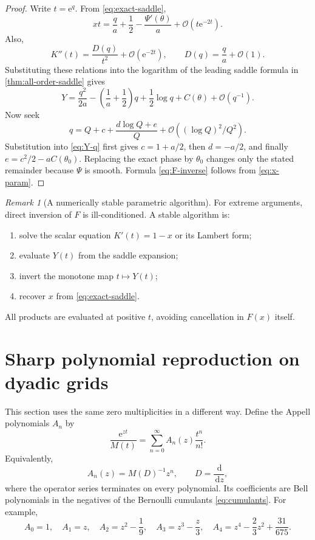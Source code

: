 \documentclass[11pt,oneside]{article}
\theoremstyle{definition}
\theoremstyle{remark}
\newtheorem{remark}[theorem]{Remark}
\newcommand{\e}{\mathrm e}
\newcommand{\dd}{\,\mathrm d}
\newcommand{\bigO}{\mathcal O}
\begin{document}
\begin{proof}
Write \(t=\e^q\).  From \eqref{eq:exact-saddle},
\[
 xt=\frac q a+\frac12-\frac{\Psi'(\theta)}a+\bigO(t\e^{-2t}).
 \label{eq:x-param}
\]
Also,
\[
 K''(t)
 =\frac{D(q)}{t^2}+\bigO(\e^{-2t}),
 \qquad
 D(q)=\frac q a+\bigO(1).
\]
Substituting these relations into the logarithm of the leading saddle formula
in \cref{thm:all-order-saddle} gives
\begin{equation}
 Y
 =\frac{q^2}{2a}
  -\left(\frac1a+\frac12\right)q
  +\frac12\log q
  +C(\theta)
  +\bigO(q^{-1}).
 \label{eq:Y-q}
\end{equation}
Now seek
\[
 q=Q+c+\frac{d\log Q+e}{Q}
   +\bigO((\log Q)^2/Q^2).
\]
Substitution into \eqref{eq:Y-q} first gives
\(c=1+a/2\), then \(d=-a/2\), and finally
\(e=c^2/2-aC(\theta_0)\).  Replacing the exact phase by \(\theta_0\)
changes only the stated remainder because \(\Psi\) is smooth.  Formula
\eqref{eq:F-inverse} follows from \eqref{eq:x-param}.
\end{proof}

\begin{remark}[A numerically stable parametric algorithm]
For extreme arguments, direct inversion of \(F\) is ill-conditioned.
A stable algorithm is:
\begin{enumerate}[label=\arabic*.,leftmargin=2em]
\item solve the scalar equation \(K'(t)=1-x\) or its Lambert form;
\item evaluate \(Y(t)\) from the saddle expansion;
\item invert the monotone map \(t\mapsto Y(t)\);
\item recover \(x\) from \eqref{eq:exact-saddle}.
\end{enumerate}
All products are evaluated at positive \(t\), avoiding cancellation in
\(F(x)\) itself.
\end{remark}

\section{Sharp polynomial reproduction on dyadic grids}

This section uses the same zero multiplicities in a different way.  Define
the Appell polynomials \(A_n\) by
\begin{equation}
 \frac{\e^{zt}}{M(t)}
 =\sum_{n=0}^{\infty}A_n(z)\frac{t^n}{n!}.
 \label{eq:Appell}
\end{equation}
Equivalently,
\begin{equation}
 A_n(z)=M(D)^{-1}z^n,\qquad D=\frac{\dd}{\dd z},
 \label{eq:Appell-operator}
\end{equation}
where the operator series terminates on every polynomial.  Its coefficients
are Bell polynomials in the negatives of the Bernoulli cumulants
\eqref{eq:cumulants}.  For example,
\[
 A_0=1,\quad A_1=z,\quad
 A_2=z^2-\frac19,\quad
 A_3=z^3-\frac z3,\quad
 A_4=z^4-\frac23z^2+\frac{31}{675}.
\]
\end{document}
